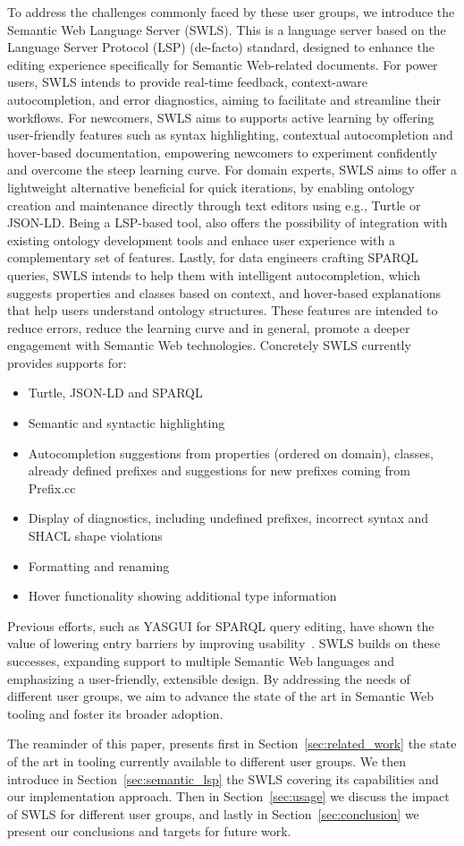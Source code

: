 To address the challenges commonly faced by these user groups, we introduce the Semantic Web Language Server (SWLS).
This is a language server based on the Language Server Protocol (LSP) (de-facto) standard, designed to enhance the editing experience specifically for Semantic Web-related documents. 
For power users, SWLS intends to provide real-time feedback, context-aware autocompletion, and error diagnostics, aiming to facilitate and streamline their workflows.
For newcomers, SWLS aims to supports active learning by offering user-friendly features such as syntax highlighting, contextual autocompletion and hover-based documentation, empowering newcomers to experiment confidently and overcome the steep learning curve.
For domain experts, SWLS aims to offer a lightweight alternative beneficial for quick iterations, by enabling ontology creation and maintenance directly through text editors using e.g., Turtle or JSON-LD. Being a LSP-based tool, also offers the possibility of integration with existing ontology development tools and enhace user experience with a complementary set of features.
Lastly, for data engineers crafting SPARQL queries, SWLS intends to help them with intelligent autocompletion, which suggests properties and classes based on context, and hover-based explanations that help users understand ontology structures.
These features are intended to reduce errors, reduce the learning curve and in general, promote a deeper engagement with Semantic Web technologies.
Concretely SWLS currently provides supports for:
\begin{itemize}
  \item Turtle, JSON-LD and SPARQL
  \item Semantic and syntactic highlighting
  \item Autocompletion suggestions from properties (ordered on domain), classes, already defined prefixes and suggestions for new prefixes coming from Prefix.cc
  \item Display of diagnostics, including undefined prefixes, incorrect syntax and SHACL shape violations
  \item Formatting and renaming
  \item Hover functionality showing additional type information
\end{itemize}

Previous efforts, such as YASGUI for SPARQL query editing, have shown the value of lowering entry barriers by improving usability~\cite{10.3233/SW-150197,10.1007/978-3-642-41242-4_7}. 
SWLS builds on these successes, expanding support to multiple Semantic Web languages and emphasizing a user-friendly, extensible design. 
By addressing the needs of different user groups, we aim to advance the state of the art in Semantic Web tooling and foster its broader adoption.

The reaminder of this paper, presents first in Section~\ref{sec:related_work} the state of the art in tooling currently available to different user groups.
We then introduce in Section~\ref{sec:semantic_lsp} the SWLS covering its capabilities and our implementation approach.
Then in Section~\ref{sec:usage} we discuss the impact of SWLS for different user groups,
and lastly in Section~\ref{sec:conclusion} we present our conclusions and targets for future work.

